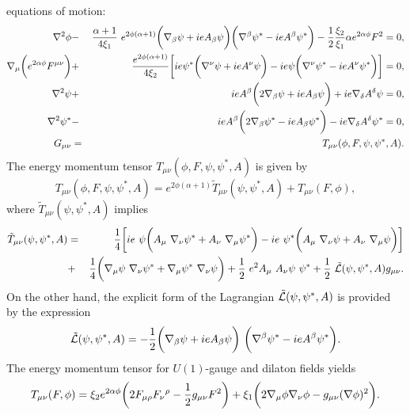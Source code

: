 \documentclass[aps,showpacs,nofootinbib,floatfix]{revtex4}
\newcommand{\be}{\begin{equation}}
\newcommand{\ee}{\end{equation}}
\newcommand{\ben}{\begin{eqnarray}}
\newcommand{\een}{\end{eqnarray}}
\newcommand{\na}{\nabla}
\newcommand{\tT}{\tilde T}
\newcommand{\zpsi}{\psi^{\ast}}
\begin{document}
equations of motion:
\ben
\na^{2} \phi &-&
{\alpha + 1 \over 4 \xi_1}~e^{2 \phi (\alpha + 1)}  \bigg( 
\na_{\beta} \psi + i e A_{\beta} \psi \bigg) 
\bigg( \na^{\beta} \zpsi - i e A^{\beta} \zpsi \bigg)
- {1 \over 2} {\xi_2 \over \xi_1} \alpha
e^{ 2 \alpha \phi} F^{2} = 0,  \label{aaa} \\
 \na_{\mu} \bigg( e^{ 2 \alpha  \phi} F^{\mu \nu} \bigg) 
&+& {e^{2 \phi (\alpha + 1)}\over 4 \xi_2} \bigg[
i e \zpsi \bigg( \na^{\nu} \psi + i e A^{\nu} \psi \bigg)
- i e \psi \bigg( \na^{\nu} \zpsi - i e A^{\nu} \zpsi \bigg)
\bigg] = 0, \label{bbb}\\
\na^{2} \psi &+& i e A^{\beta} \bigg(
2 \na_{\beta} \psi + i e A_{\beta} \psi \bigg)
+ i e \na_{\delta} A^{\delta} \psi = 0, \label{ccc} \\
\na^{2} \zpsi &-& i e A^{\beta} \bigg(
2 \na_{\beta} \zpsi - i e A_{\beta} \zpsi \bigg)
- i e \na_{\delta} A^{\delta} \zpsi = 0, \label{c1c1c1} \\
G_{\mu \nu} &=& T_{\mu \nu}(\phi, F, \psi, \zpsi, A).
\een
The energy momentum tensor $T_{\mu \nu}(\phi, F, \psi, \zpsi, A)$ is given by
\be
T_{\mu \nu}(\phi, F, \psi, \zpsi, A) = e^{2 \phi( \alpha + 1)}
\tT_{\mu \nu}(\psi, \zpsi, A) + T_{\mu \nu}(F, \phi),
\label{ten}
\ee
where $\tT_{\mu \nu}(\psi, \zpsi, A)$ implies
\ben
\tT_{\mu \nu}(\psi, \zpsi, A) &=& 
{1 \over 4} \bigg[
ie ~\psi \bigg( 
A_{\mu}~\na_{\nu} \zpsi + A_{\nu}~\na_{\mu} \zpsi \bigg) - 
ie~\zpsi \bigg( 
A_{\mu}~\na_{\nu}\psi + A_{\nu}~\na_{\mu}\psi \bigg) \bigg]
\\ \nonumber
&+&
{1 \over 4} \bigg(
\na_{\mu} \psi~ \na_{\nu} \zpsi + \na_{\mu} \zpsi~ \na_{\nu} \psi \bigg) +
{1 \over 2}~e^2 A_{\mu}~ A_{\nu} \psi~ \zpsi +
{1 \over 2}~\tilde {\cal L}(\psi, \zpsi, A) g_{\mu \nu}.
\een
On the other hand, 
the explicit form of the Lagrangian $\tilde {\cal L}(\psi, \zpsi, A)$ is provided by the expression
\be
\tilde {\cal L}(\psi, \zpsi, A) = - {1 \over 2} \bigg(
\na_{\beta} \psi + i e A_{\beta} \psi \bigg)~
\bigg( \na^{\beta} \zpsi - i e A^{\beta} \zpsi \bigg).
\ee
The energy momentum tensor for $U(1)$-gauge and dilaton fields yields
\be
T_{\mu \nu}(F, \phi) = \xi_2 e^{2 \alpha \phi} \bigg(
2 F_{\mu \rho} F_{\nu}{}{}^{\rho} - {1 \over 2} g_{\mu \nu} F^2 \bigg )
+ \xi_1 \bigg( 2 \na_{\mu} \phi \na_{\nu} \phi - g_{\mu \nu} (\na \phi)^2 \bigg).
\label{ten-2}
\ee
\end{document}
